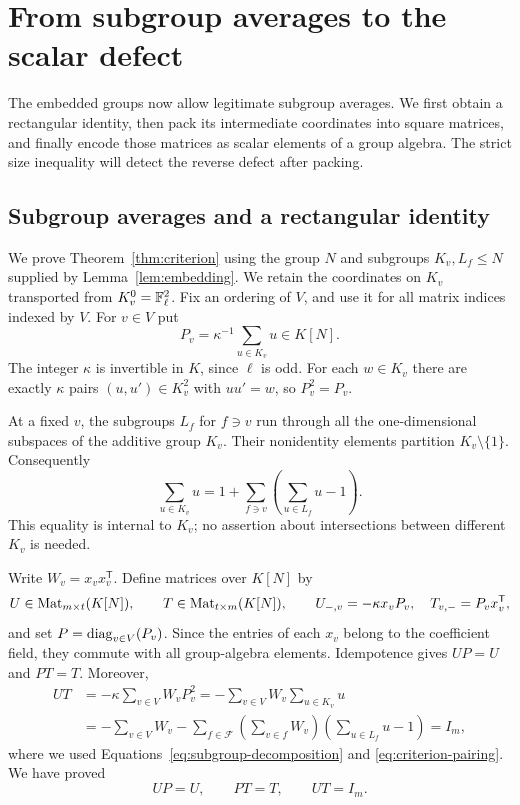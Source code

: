 

\section{From subgroup averages to the scalar defect}
\label{sec:packing}

The embedded groups now allow legitimate subgroup averages. We first obtain a rectangular identity, then pack its intermediate coordinates into square matrices, and finally encode those matrices as scalar elements of a group algebra. The strict size inequality will detect the reverse defect after packing.

\subsection{Subgroup averages and a rectangular identity}

We prove Theorem~\ref{thm:criterion} using the group $N$ and subgroups
$K_v,L_f\le N$ supplied by Lemma~\ref{lem:embedding}. We retain the
coordinates on $K_v$ transported from $K_v^0=\mathbb F_\ell^2$. Fix an
ordering of $V$, and use it for all matrix indices indexed by $V$.
For $v\in V$ put
\begin{equation}
\label{eq:local-average}
P_v=\kappa^{-1}\sum_{u\in K_v}u\in K[N].
\end{equation}
The integer $\kappa$ is invertible in $K$, since $\ell$ is odd. For each
$w\in K_v$ there are exactly $\kappa$ pairs $(u,u')\in K_v^2$ with
$uu'=w$, so $P_v^2=P_v$.

At a fixed $v$, the subgroups $L_f$ for $f\ni v$ run through all the
one-dimensional subspaces of the additive group $K_v$. Their nonidentity
elements partition $K_v\setminus\{1\}$. Consequently
\begin{equation}
\label{eq:subgroup-decomposition}
\sum_{u\in K_v}u
=1+\sum_{f\ni v}\left(\sum_{u\in L_f}u-1\right).
\end{equation}
This equality is internal to $K_v$; no assertion about intersections
between different $K_v$ is needed.

Write $W_v=x_vx_v^{\mathsf T}$. Define matrices over $K[N]$ by
\begin{equation}
\label{eq:rectangular-definitions}
U\in\operatorname{Mat}_{m\times t}(K[N]),\qquad
T\in\operatorname{Mat}_{t\times m}(K[N]),\qquad
U_{-,v}=-\kappa x_vP_v,\quad
T_{v,-}=P_vx_v^{\mathsf T},
\end{equation}
and set $P=\operatorname{diag}_{v\in V}(P_v)$. Since the entries of each $x_v$
belong to the coefficient field, they commute with all group-algebra
elements. Idempotence gives $UP=U$ and $PT=T$. Moreover,
\begin{align*}
UT
&=-\kappa\sum_{v\in V}W_vP_v^2
 =-\sum_{v\in V}W_v\sum_{u\in K_v}u\\
&=-\sum_{v\in V}W_v
 -\sum_{f\in\mathcal F}
   \left(\sum_{v\in f}W_v\right)
   \left(\sum_{u\in L_f}u-1\right)
 =I_m,
\end{align*}
where we used Equations~\eqref{eq:subgroup-decomposition} and
\eqref{eq:criterion-pairing}. We have proved
\begin{equation}
\label{eq:rectangular-identities}
UP=U,\qquad PT=T,\qquad UT=I_m.
\end{equation}

